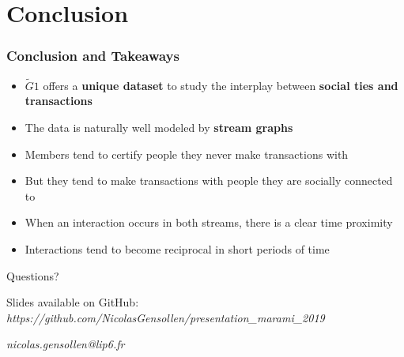 \documentclass{beamer}
\begin{document}
\section{Conclusion}

\begin{frame}
	\frametitle{Conclusion and Takeaways}
	\begin{itemize}
		\item $\tilde{G}1$ offers a \textbf{unique dataset} to study the interplay between \textbf{social ties and transactions}
		\item The data is naturally well modeled by \textbf{stream graphs}
	\end{itemize}
	\medskip
	\begin{itemize}
		\item Members tend to certify people they never make transactions with
		\item But they tend to make transactions with people they are socially connected to
		\item When an interaction occurs in both streams, there is a clear time proximity
		\item Interactions tend to become reciprocal in short periods of time
	\end{itemize}
\end{frame}


\begin{frame}
	\Huge{\centerline{Questions?}}
	\bigskip
	{\normalsize Slides available on GitHub: \\ \textit{https://github.com/NicolasGensollen/presentation\_marami\_2019}}
	\bigskip	
	\begin{center}
	{\normalsize \textit{nicolas.gensollen@lip6.fr}}
	\end{center}
\end{frame}

\end{document}
